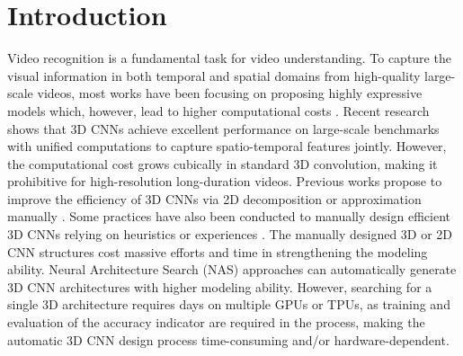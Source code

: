 \documentclass{article} \usepackage{iclr2023_conference,times}
\begin{document}
\section{Introduction}
\vspace{-0.5em}
Video recognition is a fundamental task for video understanding. 
To capture the visual information in both temporal and spatial domains from  high-quality large-scale videos, most works have been focusing on proposing highly expressive models which, however, lead to higher computational costs \cite{kondratyuk2021movinets,zhang2022revisiting,liuniformer}.
Recent research shows that 3D CNNs achieve excellent performance on large-scale benchmarks \citep{hara3dcnns} with unified computations to capture spatio-temporal features jointly. 
However, the computational cost grows cubically in standard 3D convolution, making it prohibitive for high-resolution long-duration videos.
Previous works propose to improve the efficiency of 3D CNNs via 2D decomposition or approximation manually \citep{carreira2017i3d,tran2018R21d,feichtenhofer2020x3d}.
Some practices have also been conducted to manually design efficient 3D CNNs relying on heuristics or experiences \citep{hara3dcnns,feichtenhofer2020x3d}. The manually designed 3D or 2D CNN structures cost massive efforts and time in strengthening the modeling ability.
Neural Architecture Search (NAS) approaches \citep{kondratyuk2021movinets,wang2020pv} can automatically generate 3D CNN architectures with higher modeling ability. 
However, searching for a single 3D architecture requires days on multiple GPUs or TPUs, as training and evaluation of the accuracy indicator are required in the process, making the automatic 3D CNN design process time-consuming and/or hardware-dependent.
\end{document}
